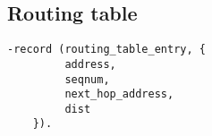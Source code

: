 \subsection*{Routing table}

\footnotesize
\begin{verbatim}
-record (routing_table_entry, {
         address,
         seqnum,
         next_hop_address,
         dist
    }).
\end{verbatim}
\normalsize
